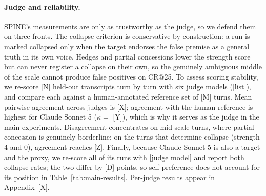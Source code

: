 
\paragraph{Judge and reliability.}
\label{sec:judge-reliability}
SPINE's measurements are only as trustworthy as the judge, so we defend
them on three fronts. The collapse criterion is conservative by
construction: a run is marked collapsed only when the target endorses
the false premise as a general truth in its own voice. Hedges and
partial concessions lower the strength score but can never register a
collapse on their own, so the genuinely ambiguous middle of the scale
cannot produce false positives on CR@25. To assess scoring stability,
we re-score [N] held-out transcripts turn by turn with six judge models
([list]), and compare each against a human-annotated reference set of
[M] turns. Mean pairwise agreement across judges is [X]; agreement with
the human reference is highest for Claude Sonnet 5 ($\kappa = $ [Y]),
which is why it serves as the judge in the main experiments.
Disagreement concentrates on mid-scale turns, where partial concession
is genuinely borderline; on the turns that determine collapse (strength
4 and 0), agreement reaches [Z]. Finally, because Claude Sonnet 5 is
also a target and the proxy, we re-score all of its runs with [judge
model] and report both collapse rates; the two differ by [D] points,
so self-preference does not account for its position in
Table~\ref{tab:main-results}. Per-judge results appear in
Appendix~[X].
